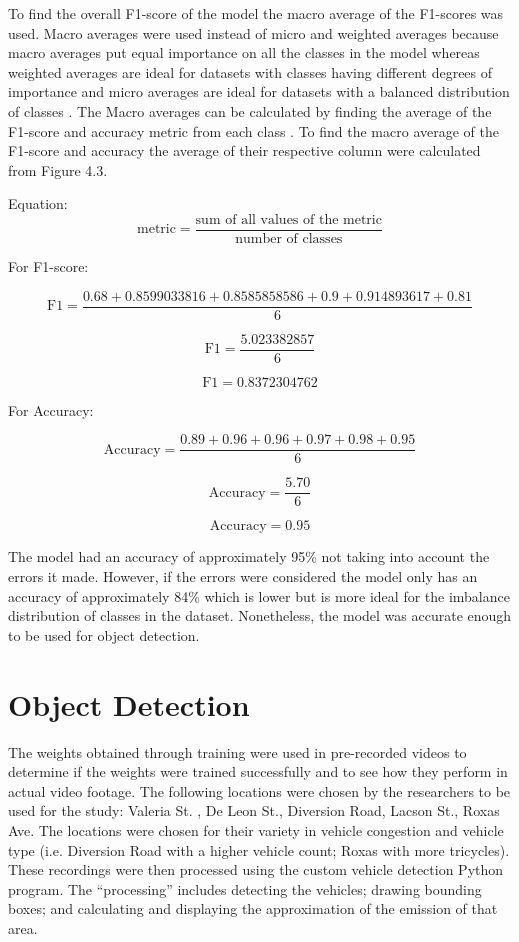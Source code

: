 To find the overall F1-score of the model the macro average of the F1-scores was used. Macro averages were used instead of micro and weighted averages because macro averages put equal importance on all the classes in the model whereas weighted averages are ideal for datasets with classes having different degrees of importance and micro averages are ideal for datasets with a balanced distribution of classes \cite{Leung_2022}. The Macro averages can be calculated by finding the average of the F1-score and accuracy metric from each class \cite{Leung_2022}. To find the macro average of the F1-score and accuracy the average of their respective column were calculated from Figure 4.3.

Equation:
\begin{equation}
	{\text{metric}}= \frac{\text{sum of all values of the metric}}{\text{number of classes}} 
\end{equation}

For F1-score:

\[{\text{F1}}= \frac{0.68 + 0.8599033816 + 0.8585858586 + 0.9 + 0.914893617 + 0.81}{6} \]

\[{\text{F1}}=  \frac{5.023382857}{6} \]


\[{\text{F1}}= 0.8372304762 \]

For Accuracy:


\[{\text{Accuracy}}= \frac{0.89 + 0.96 + 0.96 + 0.97 + 0.98 + 0.95}{6} \]

\[{\text{Accuracy}}=  \frac{5.70}{6} \]


\[{\text{Accuracy}}= 0.95 \]

The model had an accuracy of approximately 95\% not taking into account the errors it made. However, if the errors were considered the model only has an accuracy of approximately 84\% which is lower but is more ideal for the imbalance distribution of classes in the dataset. Nonetheless, the model was accurate enough to be used for object detection.




\section{Object Detection}

The weights obtained through training were used in pre-recorded videos to determine if the weights were trained successfully and to see how they perform in actual video footage. The following locations were chosen by the researchers to be used for the study: Valeria St. , De Leon St., Diversion Road, Lacson St., Roxas Ave. The locations were chosen for their variety in vehicle congestion and vehicle type (i.e. Diversion Road with a higher vehicle count; Roxas with more tricycles).  These recordings were then processed using the custom vehicle detection Python program. The “processing” includes detecting the vehicles; drawing bounding boxes; and calculating and displaying the approximation of the emission of that area. 

